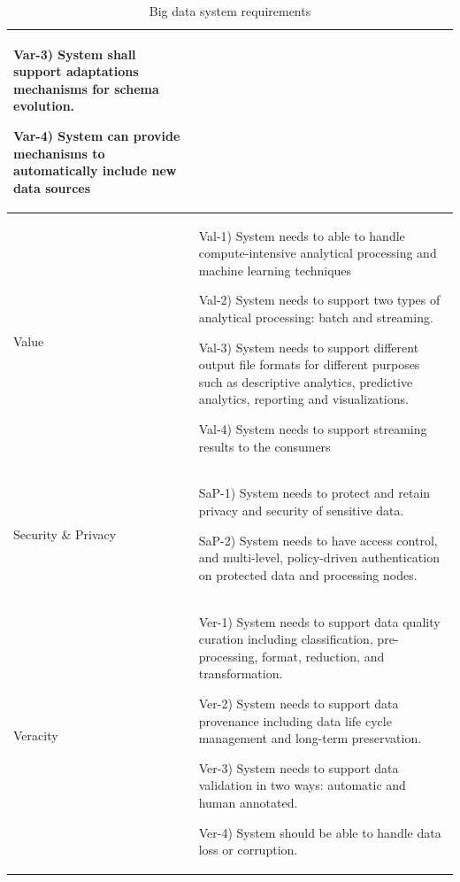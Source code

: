 \documentclass[conference]{IEEEtran}
\begin{document}
\begin{center}
\begin{table}[h]
\begin{tabular}{ | m{1.2cm} | m{14cm} |}
        Var-3) System shall support adaptations mechanisms for schema evolution.

        Var-4) System can provide mechanisms to automatically include new data sources 

        \\

        \hline

        Value & 
        
        Val-1) System needs to able to handle compute-intensive analytical processing and machine learning techniques 
        
        Val-2) System needs to support two types of analytical processing: batch and streaming. 

        Val-3) System needs to support different output file formats for different purposes such as descriptive analytics, predictive analytics, reporting and visualizations. 
        
        Val-4) System needs to support streaming results to the consumers 

        \\

        \hline

        Security \& Privacy & 
        
        SaP-1) System needs to protect and retain privacy and security of sensitive data.

        SaP-2) System needs to have access control, and multi-level, policy-driven authentication on protected data and processing nodes. 

        \\

        \hline
        
        Veracity &
        
        Ver-1) System needs to support data quality curation including classification, pre-processing, format, reduction, and  transformation. 
        
        Ver-2) System needs to support data provenance including data life cycle management and long-term preservation.
        
        Ver-3) System needs to support data validation in two ways: automatic and human annotated. 

        Ver-4) System should be able to handle data loss or corruption. 
        
        \\
        
        \hline
  
    \end{tabular}
    \caption{Big data system requirements}
    \label{table-requirements}
    \end{table}
\end{center}
\end{document}
